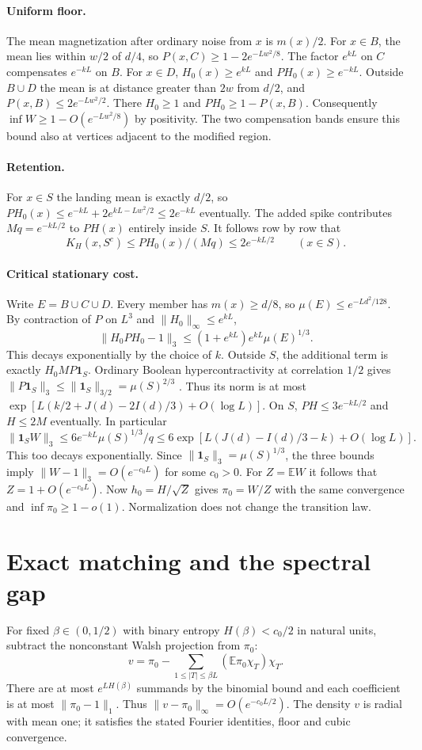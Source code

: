\documentclass[11pt]{article}
\newcommand{\E}{\mathbb E}
\newcommand{\one}{\mathbf 1}
\begin{document}
\paragraph{Uniform floor.}
The mean magnetization after ordinary noise from $x$ is $m(x)/2$. For $x\in B$, the mean lies within $w/2$ of $d/4$, so $P(x,C)\ge1-2e^{-Lw^2/8}$. The factor $e^{kL}$ on $C$ compensates $e^{-kL}$ on $B$. For $x\in D$, $H_0(x)\ge e^{kL}$ and $PH_0(x)\ge e^{-kL}$. Outside $B\cup D$ the mean is at distance greater than $2w$ from $d/2$, and $P(x,B)\le2e^{-Lw^2/2}$. There $H_0\ge1$ and $PH_0\ge1-P(x,B)$. Consequently $\inf W\ge1-O(e^{-Lw^2/8})$ by positivity. The two compensation bands ensure this bound also at vertices adjacent to the modified region.

\paragraph{Retention.}
For $x\in S$ the landing mean is exactly $d/2$, so
$PH_0(x)\le e^{-kL}+2 e^{kL-Lw^2/2}\le2e^{-kL}$ eventually.
The added spike contributes $Mq=e^{-kL/2}$ to $PH(x)$ entirely inside $S$. It follows row by row that
\[
 K_H(x,S^c)\le PH_0(x)/(Mq)\le2e^{-kL/2}\qquad(x\in S).
\]

\paragraph{Critical stationary cost.}
Write $E=B\cup C\cup D$. Every member has $m(x)\ge d/8$, so $\mu(E)\le e^{-Ld^2/128}$. By contraction of $P$ on $L^3$ and $\|H_0\|_\infty\le e^{kL}$,
\[
 \|H_0PH_0-1\|_3\le (1+e^{kL})e^{kL}\mu(E)^{1/3}.
\]
This decays exponentially by the choice of $k$. Outside $S$, the additional term is exactly $H_0 M P\one_S$. Ordinary Boolean hypercontractivity at correlation $1/2$ gives $\|P\one_S\|_3\le\|\one_S\|_{3/2}=\mu(S)^{2/3}$ \cite{bonami}. Thus its norm is at most $\exp[L(k/2+J(d)-2I(d)/3)+O(\log L)]$. On $S$, $PH\le3e^{-kL/2}$ and $H\le 2M$ eventually. In particular
\[
 \|\one_S W\|_3\le6 e^{-kL}\mu(S)^{1/3}/q
 \le 6\exp[L(J(d)-I(d)/3-k)+O(\log L)] .
\]
This too decays exponentially. Since $\|\one_S\|_3=\mu(S)^{1/3}$, the three bounds imply $\|W-1\|_3=O(e^{-c_0L})$ for some $c_0>0$. For $Z=\E W$ it follows that $Z=1+O(e^{-c_0L})$. Now $h_0=H/\sqrt Z$ gives $\pi_0=W/Z$ with the same convergence and $\inf\pi_0\ge1-o(1)$. Normalization does not change the transition law.

\section{Exact matching and the spectral gap}\label{matching}
For fixed $\beta\in(0,1/2)$ with binary entropy $H(\beta)<c_0/2$ in natural units, subtract the nonconstant Walsh projection from $\pi_0$:
\[
 v=\pi_0-\sum_{1\le|T|\le\beta L}(\E\pi_0\chi_T)\chi_T.
\]
There are at most $e^{LH(\beta)}$ summands by the binomial bound and each coefficient is at most $\|\pi_0-1\|_1$. Thus $\|v-\pi_0\|_\infty=O(e^{-c_0L/2})$. The density $v$ is radial with mean one; it satisfies the stated Fourier identities, floor and cubic convergence.
\end{document}

